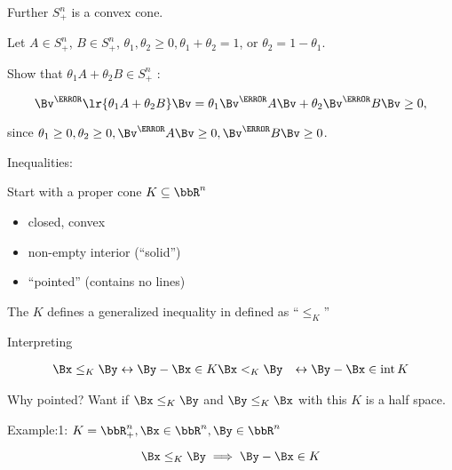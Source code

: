Further \( S^n_{+} \) is a convex cone.

Let \( A \in S^n_{+} \), \( B \in S^n_{+} \), \( \theta_1, \theta_2 \ge 0, \theta_1 + \theta_2 = 1 \), or \( \theta_2 = 1 - \theta_1 \).

Show that \( \theta_1 A + \theta_2 B \in S^n_{+} \) :

\begin{dmath}\label{eqn:convexOptimizationLecture4:460}
\Bv^\T \lr{  \theta_1 A + \theta_2 B } \Bv
=
\theta_1 \Bv^\T A \Bv
+\theta_2 \Bv^\T B \Bv
\ge 0,
\end{dmath}

since \( \theta_1 \ge 0, \theta_2 \ge 0, \Bv^\T A \Bv \ge 0, \Bv^\T B \Bv \ge 0 \).


Inequalities:

Start with a proper cone \( K \subseteq \bbR^n \)

\begin{itemize}
\item closed, convex
\item non-empty interior (``solid'')
\item ``pointed'' (contains no lines)
\end{itemize}

The \( K \) defines a generalized inequality in  defined as ``\(\le_K\)''

Interpreting

\begin{dmath}\label{eqn:convexOptimizationLecture4:480}
\begin{aligned}
\Bx \le_K \By &\leftrightarrow \By - \Bx \in K
\Bx <_K \By   &\leftrightarrow \By - \Bx \in \interior K
\end{aligned}
\end{dmath}

Why pointed?  Want if \( \Bx \le_K \By \) and \( \By \le_K \Bx \) with this \( K \) is a half space.

Example:1: \( K = \bbR^n_{+}, \Bx \in \bbR^n, \By \in \bbR^n \)


\begin{equation}\label{eqn:convexOptimizationLecture4:500}
\Bx \le_K \By \implies \By - \Bx \in K
\end{equation}

